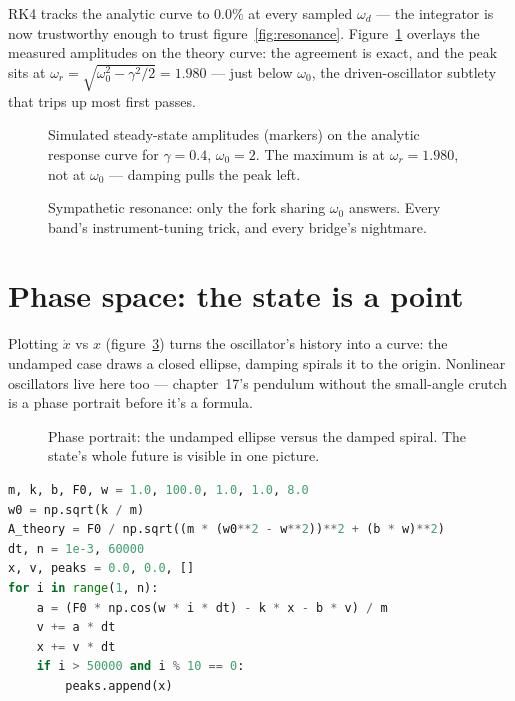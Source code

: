 RK4 tracks the analytic curve to $0.0\%$ at every sampled $\omega_d$ ---
the integrator is now trustworthy enough to trust figure~\ref{fig:resonance}.
Figure~\ref{fig:amplresp} overlays the measured amplitudes on the theory
curve: the agreement is exact, and the peak sits at
$\omega_r=\sqrt{\omega_0^2-\gamma^2/2}=1.980$ --- just below $\omega_0$,
the driven-oscillator subtlety that trips up most first passes.

\begin{figure}[htbp]\centering

\caption{Simulated steady-state amplitudes (markers) on the analytic
response curve for $\gamma=0.4$, $\omega_0=2$. The maximum is at
$\omega_r=1.980$, not at $\omega_0$ --- damping pulls the peak left.}
\label{fig:amplresp}
\end{figure}

\begin{figure}[htbp]\centering

\caption{Sympathetic resonance: only the fork sharing $\omega_0$ answers.
Every band's instrument-tuning trick, and every bridge's nightmare.}
\label{fig:fork}
\end{figure}

\section{Phase space: the state is a point}\label{sec:osc-phase}

Plotting $\dot x$ vs $x$ (figure~\ref{fig:phase}) turns the oscillator's
history into a curve: the undamped case draws a closed ellipse, damping
spirals it to the origin. Nonlinear oscillators live here too ---
chapter~17's pendulum without the small-angle crutch is a phase portrait
before it's a formula.

\begin{figure}[htbp]\centering

\caption{Phase portrait: the undamped ellipse versus the damped spiral.
The state's whole future is visible in one picture.}
\label{fig:phase}
\end{figure}

\begin{lstlisting}[language=Python,caption={\texttt{code/ch07\_driven\_transient.py} --- driven oscillator: the beat ring-up dies out, leaving the theory's amplitude.},label={lst:transient}]
m, k, b, F0, w = 1.0, 100.0, 1.0, 1.0, 8.0
w0 = np.sqrt(k / m)
A_theory = F0 / np.sqrt((m * (w0**2 - w**2))**2 + (b * w)**2)
dt, n = 1e-3, 60000
x, v, peaks = 0.0, 0.0, []
for i in range(1, n):
    a = (F0 * np.cos(w * i * dt) - k * x - b * v) / m
    v += a * dt
    x += v * dt
    if i > 50000 and i % 10 == 0:
        peaks.append(x)
\end{lstlisting}

